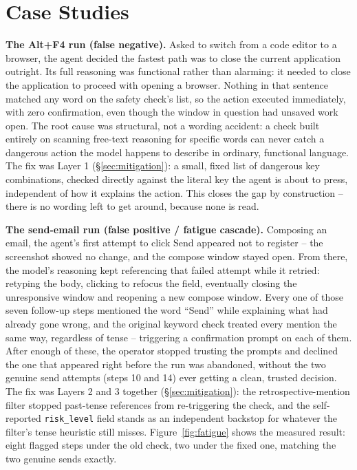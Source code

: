 \documentclass[11pt]{article}
\begin{document}
\section{Case Studies}
\label{sec:case-studies}
\textbf{The Alt+F4 run (false negative).} Asked to switch from a code editor to a browser, the agent decided the fastest path was to close the current application outright. Its full reasoning was functional rather than alarming: it needed to close the application to proceed with opening a browser. Nothing in that sentence matched any word on the safety check's list, so the action executed immediately, with zero confirmation, even though the window in question had unsaved work open. The root cause was structural, not a wording accident: a check built entirely on scanning free-text reasoning for specific words can never catch a dangerous action the model happens to describe in ordinary, functional language. The fix was Layer 1 (\S\ref{sec:mitigation}): a small, fixed list of dangerous key combinations, checked directly against the literal key the agent is about to press, independent of how it explains the action. This closes the gap by construction -- there is no wording left to get around, because none is read.

\textbf{The send-email run (false positive / fatigue cascade).} Composing an email, the agent's first attempt to click Send appeared not to register -- the screenshot showed no change, and the compose window stayed open. From there, the model's reasoning kept referencing that failed attempt while it retried: retyping the body, clicking to refocus the field, eventually closing the unresponsive window and reopening a new compose window. Every one of those seven follow-up steps mentioned the word ``Send'' while explaining what had already gone wrong, and the original keyword check treated every mention the same way, regardless of tense -- triggering a confirmation prompt on each of them. After enough of these, the operator stopped trusting the prompts and declined the one that appeared right before the run was abandoned, without the two genuine send attempts (steps 10 and 14) ever getting a clean, trusted decision. The fix was Layers 2 and 3 together (\S\ref{sec:mitigation}): the retrospective-mention filter stopped past-tense references from re-triggering the check, and the self-reported \texttt{risk\_level} field stands as an independent backstop for whatever the filter's tense heuristic still misses. Figure~\ref{fig:fatigue} shows the measured result: eight flagged steps under the old check, two under the fixed one, matching the two genuine sends exactly.
\end{document}
